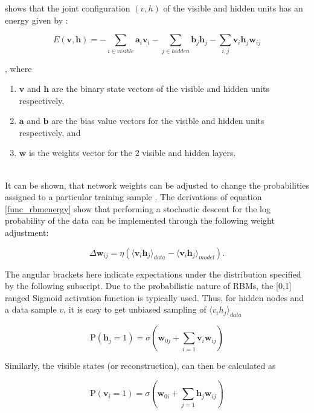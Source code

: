 \documentclass[a4paper,11pt,oneside]{article}
\theoremstyle{plain}
\theoremstyle{definition}
\begin{document}
	\citet{Hinton5} shows that the joint configuration $(v,h)$ of the visible and hidden units has an energy given by :
	
	\begin{equation}\label{func_rbmenergy}
	E(\mathbf{v},\mathbf{h}) = - \sum_{i \in visible} \mathbf{a}_i\mathbf{v}_i - \sum_{j \in hidden} \mathbf{b}_j\mathbf{h}_j - \sum_{i,j}\mathbf{v}_i\mathbf{h}_j\mathbf{w}_{ij}
	\end{equation}
	
	, where
	\begin{enumerate}
		\item $\mathbf{v}$ and $\mathbf{h}$ are the binary state vectors of the visible and hidden units respectively, 
		\item $\mathbf{a}$ and $\mathbf{b}$ are the bias value vectors for the visible and hidden units respectively, and
		\item $\mathbf{w}$ is the weights vector for the 2 visible and hidden layers.
	\end{enumerate}
	~\\
	It can be shown, that network weights can be adjusted to change the probabilities assigned to a particular training sample . The derivations of equation \eqref{func_rbmenergy} show that performing a stochastic descent for the log probability of the data can be implemented through the following weight adjustment:
	
	\begin{equation}
	\Delta \mathbf{w}_{ij} = \eta (\langle \mathbf{v}_i\mathbf{h}_j\rangle_{data} - \langle \mathbf{v}_i\mathbf{h}_j\rangle_{model}) .
	\end{equation}
	
	The angular brackets here indicate expectations under the distribution specified by the following subscript. Due to the probabilistic nature of RBMs, the [0,1] ranged Sigmoid activation function is typically used. Thus, for hidden nodes and a data sample $v$, it is easy to get unbiased sampling of $\langle v_ih_j \rangle_{data}$
	
	\begin{equation}
	\mathrm{P}(\mathbf{h}_j=1) = \sigma(\mathbf{w}_{0j} +  \sum_{i=1}\mathbf{v}_i\mathbf{w}_{ij})
	\end{equation}
	
	Similarly, the visible states (or reconstruction), can then be calculated as 
	
	\begin{equation}
	\mathrm{P}(\mathbf{v}_i=1) = \sigma(\mathbf{w}_{0i} + \sum_{j=1}\mathbf{h}_j\mathbf{w}_{ij})
	\end{equation}
	
\end{document}
